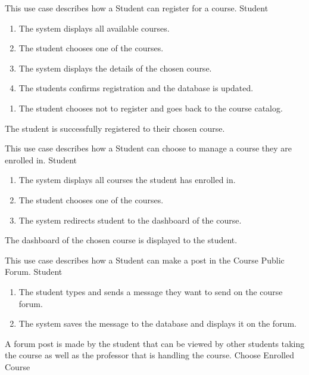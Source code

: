 \documentclass[12pt, a4]{report}
\begin{document}
{ %
This use case describes how a Student can register for a course.
}
{ %
Student
}
{ %
\begin{enumerate}
    \item The system displays all available courses.
    \item The student chooses one of the courses.
    \item The system displays the details of the chosen course.
    \item The students confirms registration and the database is updated.
\end{enumerate}
}
{ %
\begin{enumerate}
    \item The student chooses not to register and goes back to the course catalog.
\end{enumerate}
}
{ %
}
{ %
The student is successfully registered to their chosen course.
}
{ %
}
{ %
}


{ %
This use case describes how a Student can choose to manage a course they are enrolled in.
}
{ %
Student
}
{ %
\begin{enumerate}
    \item The system displays all courses the student has enrolled in.
    \item The student chooses one of the courses.
    \item The system redirects student to the dashboard of the course.
\end{enumerate}
}
{ %
}
{ %
}
{ %
The dashboard of the chosen course is displayed to the student.
}
{ %
}
{ %
}


{ %
This use case describes how a Student can make a post in the Course Public Forum.
}
{ %
Student
}
{ %
\begin{enumerate}
    \item The student types and sends a message they want to send on the course forum.
    \item The system saves the message to the database and displays it on the forum.
\end{enumerate}
}
{ %
}
{ %
}
{ %
A forum post is made by the student that can be viewed by other students taking the course as well as the professor that is handling the course.
}
{ %
Choose Enrolled Course
}
{ %
}
\end{document}
